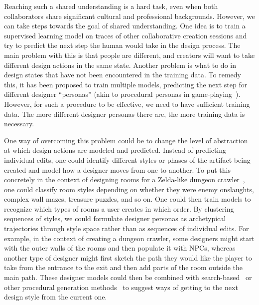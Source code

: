 Reaching such a shared understanding is a hard task, even when both collaborators share significant cultural and professional backgrounds.
However, we can take steps towards the goal of shared understanding. One idea is to train a supervised learning model on traces of other collaborative creation sessions and try to predict the next step the human would take in the design process. The main problem with this is that people are different, and creators will want to take different design actions in the same state. Another problem is what to do in design states that have not been encountered in the training data. To remedy this, it has been proposed to train multiple models, predicting the next step for different designer ``personas'' (akin to procedural personas in game-playing~\cite{p10Holmgard2019-proceduralPersonas}). However, for such a procedure to be effective, we need to have sufficient training data. The more different designer personas there are, the more training data is necessary.

One way of overcoming this problem could be to change the level of abstraction at which design actions are modeled and predicted. Instead of predicting individual edits, one could identify different styles or phases of the artifact being created and model how a designer moves from one to another. To put this concretely in the context of designing rooms for a Zelda-like dungeon crawler~\cite{p10tloz}, one could classify room styles depending on whether they were enemy onslaughts, complex wall mazes, treasure puzzles, and so on. One could then train models to recognize which types of rooms a user creates in which order. By clustering sequences of styles, we could formulate designer personas as archetypical trajectories through style space rather than as sequences of individual edits. For example, in the context of creating a dungeon crawler, some designers might start with the outer walls of the rooms and then populate it with NPCs, whereas another type of designer might first sketch the path they would like the player to take from the entrance to the exit and then add parts of the room outside the main path. These designer models could then be combined with search-based~\cite{p10Togelius2011} or other procedural generation methods~\cite{p10khalifa2020-pcgrl} to suggest ways of getting to the next design style from the current one. 

